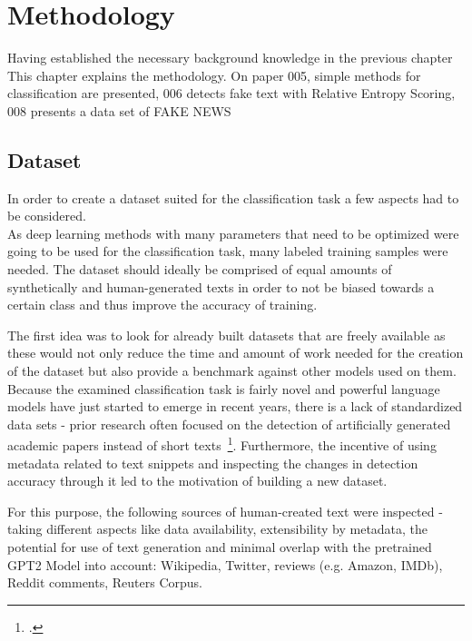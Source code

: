\section{Methodology}
\label{ch:methodology}

Having established the necessary background knowledge in the previous chapter
This chapter explains the methodology. On paper 005, simple methods for classification are presented, 006 detects fake text with Relative Entropy Scoring, 008 presents a data set of FAKE NEWS

\subsection{Dataset}
\label{sec:dataset}

In order to create a dataset suited for the classification task a few aspects had to be considered. \\
As deep learning methods with many parameters that need to be optimized were going to be used for the classification task, many labeled training samples were needed. The dataset should ideally be comprised of equal amounts of synthetically and human-generated texts in order to not be biased towards a certain class and thus improve the accuracy of training.

The first idea was to look for already built datasets that are freely available as these would not only reduce the time and amount of work needed for the creation of the dataset but also provide a benchmark against other models used on them. Because the examined classification task is fairly novel and powerful language models have just started to emerge in recent years, there is a lack of standardized data sets - prior research often focused on the detection of artificially generated academic papers instead of short texts~\footcite{lavoie2010algorithmic}. Furthermore, the incentive of using metadata related to text snippets and inspecting the changes in detection accuracy through it led to the motivation of building a new dataset.

For this purpose, the following sources of human-created text were inspected - taking different aspects like data availability, extensibility by metadata, the potential for use of text generation and minimal overlap with the pretrained GPT2 Model into account: Wikipedia, Twitter, reviews (e.g. Amazon, IMDb), Reddit comments, Reuters Corpus.

